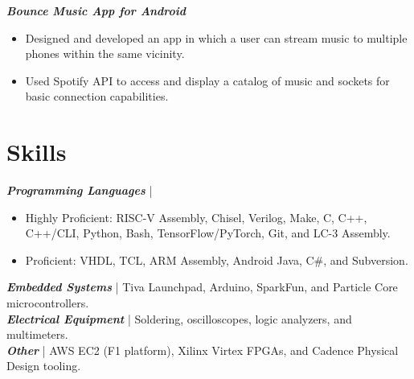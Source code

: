 \documentclass[letter]{res}
\begin{document}
\begin{resume}
\vspace{-2mm}

{\sl \textbf{Bounce Music App for Android}}\\

 \vspace{-4mm}

\begin{itemize}
 \item Designed and developed an app in which a user can stream music to multiple phones within the same vicinity.
 \item Used Spotify API to access and display a catalog of music and sockets for basic connection capabilities.
\end{itemize}

\vspace{-2mm}

\section{Skills}
{\sl \textbf{Programming Languages}} |
\begin{itemize}
 \item Highly Proficient: RISC-V Assembly, Chisel, Verilog, Make, C, C++, C++/CLI, Python, Bash, TensorFlow/PyTorch, Git, and LC-3 Assembly.
 \item Proficient: VHDL, TCL, ARM Assembly, Android Java, C\#, and Subversion.
\end{itemize}
 \vspace{-4mm}
{\sl \textbf{Embedded Systems}} | Tiva Launchpad, Arduino, SparkFun, and Particle Core microcontrollers.\\
{\sl \textbf{Electrical Equipment}} | Soldering, oscilloscopes, logic analyzers, and multimeters.\\
{\sl \textbf{Other}} | AWS EC2 (F1 platform), Xilinx Virtex FPGAs, and Cadence Physical Design tooling.\\

\vspace{24mm}


\end{resume}
\end{document}
